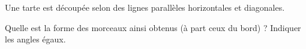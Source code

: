
\begin{exercice}\label{exo2smath-0062}

    Une tarte est découpée selon des lignes parallèles horizontales et diagonales.

\begin{center}
   
\end{center}

Quelle est la forme des morceaux ainsi obtenus (à part ceux du bord) ? Indiquer les angles égaux.


\end{exercice}
